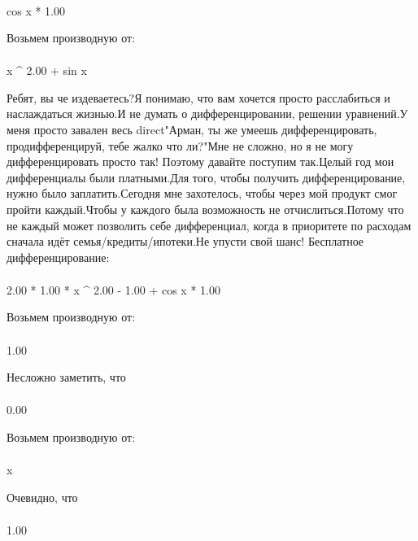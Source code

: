 \begin{gather}
\end{gather}
\begin{}
cos x * 1.00 \\
\end{}
Возьмем производную от:
\begin{gather}
\end{gather}
\begin{}
x ^ {2.00 }+ sin x \\
\end{}
Ребят, вы че издеваетесь?Я понимаю, что вам хочется просто расслабиться и наслаждаться жизнью.И не думать о дифференцировании, решении уравнений.У меня просто завален весь direct"Арман, ты же умеешь дифференцировать, продифференцируй, тебе жалко что ли?"Мне не сложно, но я не могу дифференцировать просто так! Поэтому давайте поступим так.Целый год мои дифференциалы были платными.Для того, чтобы получить дифференцирование, нужно было заплатить.Сегодня мне захотелось, чтобы через мой продукт смог пройти каждый.Чтобы у каждого была возможность не отчислиться.Потому что не каждый может позволить себе дифференциал, когда в приоритете по расходам сначала идёт семья/кредиты/ипотеки.Не упусти свой шанс! Бесплатное дифференцирование: 
\begin{gather}
\end{gather}
\begin{}
2.00 * 1.00 * x ^ {2.00 - 1.00 }+ cos x * 1.00 \\
\end{}
Возьмем производную от:
\begin{gather}
\end{gather}
\begin{}
1.00 \\
\end{}
Несложно заметить, что
\begin{gather}
\end{gather}
\begin{}
0.00 \\
\end{}
Возьмем производную от:
\begin{gather}
\end{gather}
\begin{}
x \\
\end{}
Очевидно, что
\begin{gather}
\end{gather}
\begin{}
1.00 \\
\end{}

